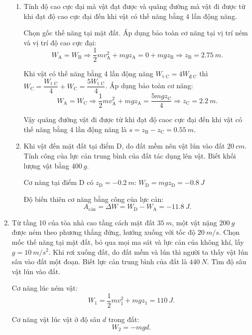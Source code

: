 \begin{enumerate}[label=\bfseries Câu \arabic*:, leftmargin=1.5cm]
	\hideall
	{	
		\begin{enumerate}[label=\alph*)]
			\item Tính độ cao cực đại mà vật đạt được và quãng đường mà vật đi được từ khi đạt độ cao cực đại đến khi vật có thế năng bằng 4 lần động năng.
			
			Chọn gốc thế năng tại mặt đất. Áp dụng bảo toàn cơ năng tại vị trí ném và vị trí độ cao cực đại:
			$$W_\text{A} = W_\text{B} \Rightarrow \dfrac{1}{2}mv_\text{A}^2 + mgz_\text{A} = 0 + mgz_\text{B} \Rightarrow z_\text{B} = \SI{2.75}{m}.$$
			
			Khi vật có thế năng bằng 4 lần động năng $W_\text{t C} = 4 W_\text{đ C}$ thì $W_\text{C} = \dfrac{W_\text{t C}}{4} + W_\text{C} = \dfrac{5 W_\text{t C}}{4}$. Áp dụng bảo toàn cơ năng:
			$$W_\text{A} = W_\text{C} \Rightarrow \dfrac{1}{2}mv_\text{A}^2 + mgz_\text{A} = \dfrac{5 mgz_\text{C}}{4}  \Rightarrow z_\text{C} = \SI{2.2}{m}.$$
			
			Vậy quãng đường vật đi được từ khi đạt độ caoc cực đại đến khi vật có thế năng bằng 4 lần động năng là $s=z_\text{B} - z_\text{C} = \SI{0.55}{m}$.
			
			\item Khi vật đến mặt đất tại điểm D, do đất mềm nên vật lún vào đất $\SI{20}{cm}$. Tính công của lực cản trung bình của đất tác dụng lên vật. Biết khối lượng vật bằng $\SI{400}{g}$.
			
			Cơ năng tại điểm D có $z_\text{D} = \SI{-0.2}{m}$: $W_\text{D} = mgz_\text{D} = \SI{-0.8}{J}$
			
			Độ biến thiên cơ năng bằng công của lực cản:
			$$A_\text{cản} = \Delta W = W_\text{D} - W_\text{A} = \SI{-11.8}{J}.$$
		\end{enumerate}
	}
	
	\item {}
	
	
	{
		Từ tầng 10 của tòa nhà cao tầng cách mặt đất $\SI{35}{m}$, một vật nặng $\SI{200}{g}$ được ném theo phương thẳng đứng, hướng xuống với tốc độ $\SI{20}{m/s}$. Chọn mốc thế năng tại mặt đất, bỏ qua mọi ma sát và lực cản của không khí, lấy $g=\SI{10}{m/s^2}$. Khi rơi xuống đất, do đất mềm và lún thì người ta thấy vật lún sâu vào đất một đoạn. Biết lực cản trung bình của đất là $\SI{440}{N}$. Tìm độ sâu vật lún vào đất.
	}
	
	\hideall
	{	
		Cơ năng lúc ném vật:
		$$W_1 = \dfrac{1}{2}mv_1^2 + mgz_1 = \SI{110}{J}.$$
		
		Cơ năng vật lúc vật ở độ sâu $d$ trong đất:
		$$W_2 = -mgd.$$
		
}
\end{enumerate}
